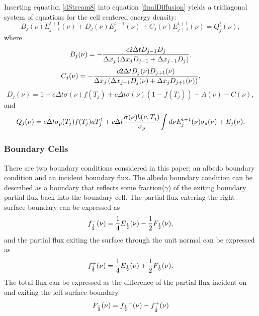 	Inserting equation \ref{dStream8} into equation \ref{finalDiffusion} yields a tridiagonal system of equations for the cell centered energy density:
	\begin{equation}
	\label{disDiff}
	B_j(\nu)E_{j-1}^{t+1}(\nu) + D_j(\nu)E_j^{t+1}(\nu) + C_j(\nu)E_{j+1}^{t+1}(\nu) = Q^t_j(\nu),
	\end{equation}
	where
	\begin{equation}
	\label{distDiffB}
	B_j(\nu)=-{c2\Delta{t}D_{j-1}D_{j}\over{\Delta{x_j}\left(\Delta{x_{j}}D_{j-1}+\Delta{x_{j-1}}D_{j}\right)}},
	\end{equation}
	\begin{equation}
	\label{distDiffC}
	C_j(\nu)=-{c2\Delta{t}D_{j}(\nu)D_{j+1}(\nu)\over{\Delta{x_j}\left(\Delta{x_{j+1}}D_{j}(\nu)+\Delta{x_{j}}D_{j+1}(\nu)\right)}},
	\end{equation}
	\begin{equation}
	\label{distDiffD}
	D_j(\nu)=1+c\Delta{t}\sigma(\nu){f(T_j)}+c\Delta{t}\sigma(\nu){(1-f(T_j))} -A(\nu) -C(\nu), 
	\end{equation}
	and
	\begin{equation}
	\label{Q_j}
	Q_j(\nu)=c\Delta{t}\sigma_p(T_j)f(T_j)aT^4_j+c\Delta{t}{\sigma(\nu)b(\nu,T_j)\over{\sigma_p}}{\int{d\nu}E^{t+1}_j(\nu)\sigma_s(\nu)}+E_j(\nu).
	\end{equation}

\belowSubSecSkip

\subsubsection{Boundary Cells}
\label{sec:Transport-Discret-Boundary-Cells}

\noindent
	\indent There are two boundary conditions considered in this paper; an albedo boundary condition and an incident boundary flux. The albedo boundary condition can be described as a boundary that reflects some fraction($\gamma$) of the exiting boundary partial flux back into the boundary cell. The partial flux entering the right surface boundary can be expressed as 
	\begin{equation}
	\label{enteringPartialFlux}
	f_{{1\over{2}}}^-(\nu)={1\over{4}}E_{{1\over{2}}}(\nu)-{1\over{2}}F_{{1\over{2}}}(\nu),
	\end{equation}
	and the partial flux exiting the surface through the unit normal can be expressed as
	\begin{equation}
	\label{exitingPartialFlux}
	f_{{1\over{2}}}^+(\nu)={1\over{4}}E_{{1\over{2}}}(\nu)+{1\over{2}}F_{{1\over{2}}}(\nu).
	\end{equation}
	The total flux can be expressed as the difference of the partial flux incident on and exiting the left surface boundary.
	\begin{equation}
	\label{totalFlux}
	F_{{1\over{2}}}(\nu)={f_{{1\over{2}}}}^{-}(\nu)-{f_{{1\over{2}}}^+(\nu)}
	\end{equation}
	
